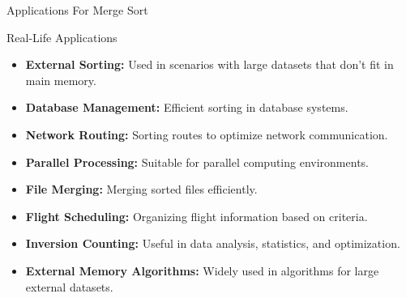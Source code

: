 \documentclass{beamer}
\begin{document}
\begin{frame}{Applications For Merge Sort}

  \begin{exampleblock}{Real-Life Applications}
    \begin{itemize}
      \item \textbf{External Sorting:} Used in scenarios with large datasets that don't fit in main memory.
      \item \textbf{Database Management:} Efficient sorting in database systems.
      \item \textbf{Network Routing:} Sorting routes to optimize network communication.
      \item \textbf{Parallel Processing:} Suitable for parallel computing environments.
      \item \textbf{File Merging:} Merging sorted files efficiently.
      \item \textbf{Flight Scheduling:} Organizing flight information based on criteria.
      \item \textbf{Inversion Counting:} Useful in data analysis, statistics, and optimization.
      \item \textbf{External Memory Algorithms:} Widely used in algorithms for large external datasets.
    \end{itemize}
  \end{exampleblock}
\end{frame}
\end{document}
